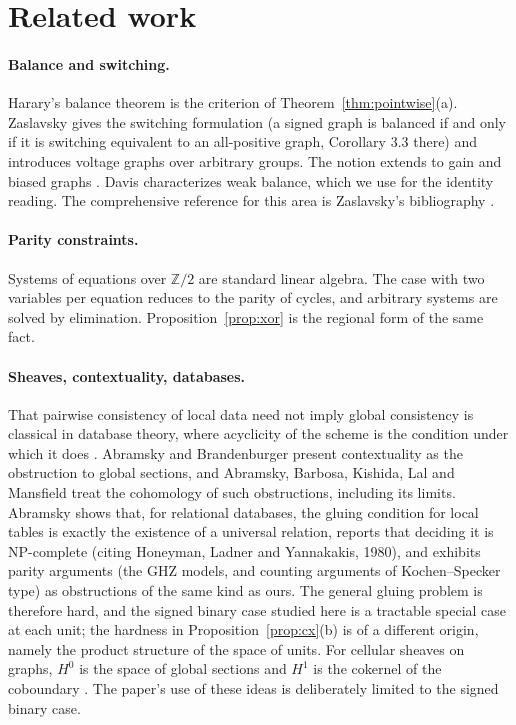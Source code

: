 \documentclass[11pt]{article}
\theoremstyle{plain}
\theoremstyle{definition}
\theoremstyle{remark}
\begin{document}
\section{Related work}\label{sec:related}

\paragraph{Balance and switching.} Harary's balance theorem \cite{harary1953} is the criterion of Theorem~\ref{thm:pointwise}(a). Zaslavsky \cite{zaslavsky1982} gives the switching formulation (a signed graph is balanced if and only if it is switching equivalent to an all-positive graph, Corollary 3.3 there) and introduces voltage graphs over arbitrary groups. The notion extends to gain and biased graphs \cite{zaslavsky1989}. Davis \cite{davis1967} characterizes weak balance, which we use for the identity reading. The comprehensive reference for this area is Zaslavsky's bibliography \cite{zaslavskybib}.

\paragraph{Parity constraints.} Systems of equations over $\mathbb Z/2$ are standard linear algebra. The case with two variables per equation reduces to the parity of cycles, and arbitrary systems are solved by elimination. Proposition~\ref{prop:xor} is the regional form of the same fact.

\paragraph{Sheaves, contextuality, databases.} That pairwise consistency of local data need not imply global consistency is classical in database theory, where acyclicity of the scheme is the condition under which it does \cite{bfmy1983}. Abramsky and Brandenburger \cite{abramsky2011} present contextuality as the obstruction to global sections, and Abramsky, Barbosa, Kishida, Lal and Mansfield \cite{abramsky2015} treat the cohomology of such obstructions, including its limits. Abramsky \cite{abramsky2013} shows that, for relational databases, the gluing condition for local tables is exactly the existence of a universal relation, reports that deciding it is NP-complete (citing Honeyman, Ladner and Yannakakis, 1980), and exhibits parity arguments (the GHZ models, and counting arguments of Kochen--Specker type) as obstructions of the same kind as ours. The general gluing problem is therefore hard, and the signed binary case studied here is a tractable special case at each unit; the hardness in Proposition~\ref{prop:cx}(b) is of a different origin, namely the product structure of the space of units. For cellular sheaves on graphs, $H^0$ is the space of global sections and $H^1$ is the cokernel of the coboundary \cite{hansenghrist2019}. The paper's use of these ideas is deliberately limited to the signed binary case.
\end{document}
